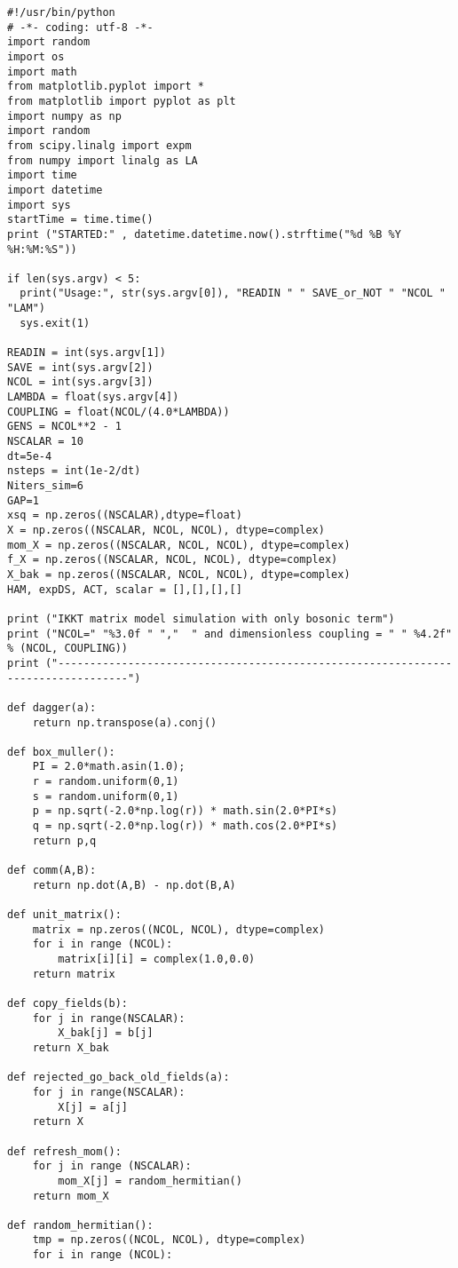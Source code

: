 \begin{lstlisting}
#!/usr/bin/python
# -*- coding: utf-8 -*-
import random
import os
import math
from matplotlib.pyplot import *
from matplotlib import pyplot as plt
import numpy as np
import random
from scipy.linalg import expm
from numpy import linalg as LA
import time 
import datetime 
import sys
startTime = time.time()
print ("STARTED:" , datetime.datetime.now().strftime("%d %B %Y %H:%M:%S"))

if len(sys.argv) < 5:
  print("Usage:", str(sys.argv[0]), "READIN " " SAVE_or_NOT " "NCOL " "LAM")
  sys.exit(1)

READIN = int(sys.argv[1])
SAVE = int(sys.argv[2])
NCOL = int(sys.argv[3]) 
LAMBDA = float(sys.argv[4])
COUPLING = float(NCOL/(4.0*LAMBDA))
GENS = NCOL**2 - 1
NSCALAR = 10
dt=5e-4
nsteps = int(1e-2/dt)
Niters_sim=6
GAP=1
xsq = np.zeros((NSCALAR),dtype=float)
X = np.zeros((NSCALAR, NCOL, NCOL), dtype=complex)
mom_X = np.zeros((NSCALAR, NCOL, NCOL), dtype=complex)
f_X = np.zeros((NSCALAR, NCOL, NCOL), dtype=complex)
X_bak = np.zeros((NSCALAR, NCOL, NCOL), dtype=complex)
HAM, expDS, ACT, scalar = [],[],[],[]

print ("IKKT matrix model simulation with only bosonic term")
print ("NCOL=" "%3.0f " ","  " and dimensionless coupling = " " %4.2f" % (NCOL, COUPLING)) 
print ("---------------------------------------------------------------------------------")

def dagger(a):
    return np.transpose(a).conj()

def box_muller():
    PI = 2.0*math.asin(1.0);    
    r = random.uniform(0,1)
    s = random.uniform(0,1)
    p = np.sqrt(-2.0*np.log(r)) * math.sin(2.0*PI*s)
    q = np.sqrt(-2.0*np.log(r)) * math.cos(2.0*PI*s)
    return p,q

def comm(A,B):
    return np.dot(A,B) - np.dot(B,A)

def unit_matrix():
    matrix = np.zeros((NCOL, NCOL), dtype=complex)
    for i in range (NCOL):
        matrix[i][i] = complex(1.0,0.0)
    return matrix

def copy_fields(b):
    for j in range(NSCALAR):
        X_bak[j] = b[j]
    return X_bak

def rejected_go_back_old_fields(a):
    for j in range(NSCALAR):
        X[j] = a[j]
    return X

def refresh_mom():
    for j in range (NSCALAR):
        mom_X[j] = random_hermitian()
    return mom_X

def random_hermitian():
    tmp = np.zeros((NCOL, NCOL), dtype=complex)
    for i in range (NCOL):


\end{lstlisting}
